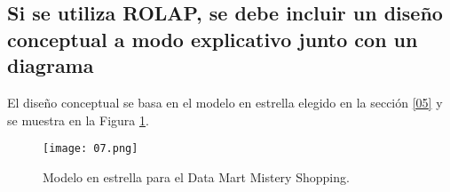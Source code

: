 \medskip
\subsection{Si se utiliza ROLAP, se debe incluir un diseño conceptual a modo explicativo junto con un diagrama}
\label{07}
El diseño conceptual se basa en el modelo en estrella elegido en la sección \ref{05} y se muestra en la Figura \ref{07-image}.
\begin{figure}[!th]
\texttt{[image: 07.png]}
\centering
\caption{Modelo en estrella para el Data Mart Mistery Shopping.}
\label{07-image}
\end{figure}
